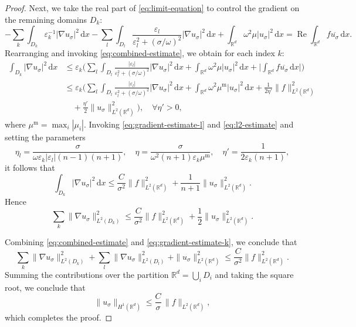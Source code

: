 \documentclass[10pt,a4paper]{amsart}
\begin{document}
\begin{proof}
Next, we take the real part of \eqref{eq:limit-equation} to control the gradient on the remaining domains $D_k$:
\begin{equation*}
    -\sum_{k} \int_{D_k} \varepsilon_k^{-1} |\nabla u_\sigma|^2\,\mathrm{d}x - \sum_{l} \int_{D_l}\dfrac{\varepsilon_l}{\varepsilon_l^2+(\sigma/\omega)^2} |\nabla u_\sigma|^2\,\mathrm{d}x + \int_{\mathbb{R}^d} \omega^2 \mu |u_\sigma|^2\,\mathrm{d}x = \operatorname{Re} \int_{\mathbb{R}^d} f\overline{u_\sigma}\,\mathrm{d}x.
\end{equation*}
Rearranging and invoking \eqref{eq:combined-estimate}, we obtain for each index $k$:
\begin{align*}
\int_{D_k} |\nabla u_\sigma|^2\,\mathrm{d}x &\leq \varepsilon_k\biggl(\sum_{l} \int_{D_l} \frac{|\varepsilon_l|}{\varepsilon_l^2 + (\sigma/\omega)^2} |\nabla u_\sigma|^2\,\mathrm{d}x + \int_{\mathbb{R}^d} \omega^2 \mu |u_\sigma|^2\,\mathrm{d}x + \biggl|\int_{\mathbb{R}^d} f\overline{u_\sigma}\,\mathrm{d}x\biggr|\biggr) \\
&\leq \varepsilon_k\biggl(\sum_{l} \int_{D_l} \frac{|\varepsilon_l|}{\varepsilon_l^2 + (\sigma/\omega)^2} |\nabla u_\sigma|^2\,\mathrm{d}x + \int_{\mathbb{R}^d} \omega^2 \mu^{\mathrm{m}} |u_\sigma|^2\,\mathrm{d}x + \frac{1}{2\eta'}\|f\|_{L^2(\mathbb{R}^d)}^2\\
&\quad+ \frac{\eta'}{2}\|u_\sigma\|_{L^2(\mathbb{R}^d)}^2\biggr),\quad\forall\eta'>0,
\end{align*}
where $\mu^{\mathrm{m}} = \max_i |\mu_i|$. Invoking \eqref{eq:gradient-estimate-l} and \eqref{eq:l2-estimate} and setting the parameters
\[
\eta_l = \frac{\sigma}{\omega\varepsilon_k |\varepsilon_l| (n-1)(n+1)}, \quad \eta = \frac{\sigma}{\omega^2(n+1)\varepsilon_k \mu^{\mathrm{m}}}, \quad \eta' = \frac{1}{2\varepsilon_k(n+1)},
\]
it follows that
\[
\int_{D_k} |\nabla u_\sigma|^2\,\mathrm{d}x \leq \frac{C}{\sigma^2}\|f\|_{L^2(\mathbb{R}^d)}^2 + \frac{1}{n+1}\|u_\sigma\|_{L^2(\mathbb{R}^d)}^2.
\]
Hence
\begin{equation}\label{eq:gradient-estimate-k}
\sum_{k} \|\nabla u_\sigma\|_{L^2(D_k)}^2 \leq \frac{C}{\sigma^2}\|f\|_{L^2(\mathbb{R}^d)}^2 + \frac{1}{2}\|u_\sigma\|_{L^2(\mathbb{R}^d)}^2.
\end{equation}

Combining \eqref{eq:combined-estimate} and \eqref{eq:gradient-estimate-k}, we conclude that
\[
\sum_{k} \|\nabla u_\sigma\|_{L^2(D_k)}^2 + \sum_{l} \|\nabla u_\sigma\|_{L^2(D_l)}^2 + \|u_\sigma\|_{L^2(\mathbb{R}^d)}^2 \leq \frac{C}{\sigma^2}\|f\|_{L^2(\mathbb{R}^d)}^2.
\]
Summing the contributions over the partition $\mathbb{R}^d = \bigcup_i D_i$ and taking the square root, we conclude that
\begin{equation*}
	\|u_\sigma\|_{H^1(\mathbb{R}^d)} \le \frac{C}{\sigma}\, \|f\|_{L^2(\mathbb{R}^d)},
\end{equation*}
which completes the proof.



\end{proof}
\end{document}
